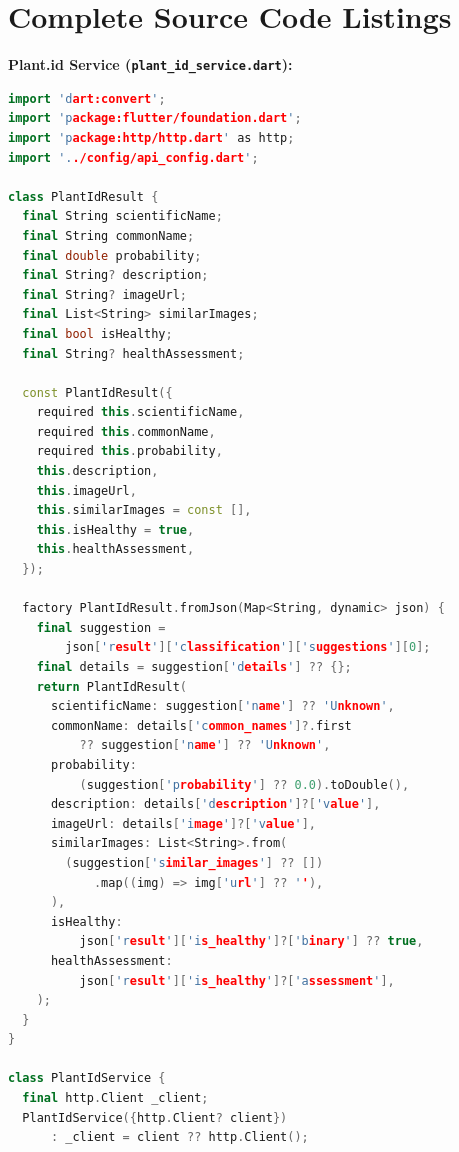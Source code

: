 \newpage
\section{Complete Source Code Listings}
\justify

\textbf{Plant.id Service (\texttt{plant\_id\_service.dart}):}
\begin{lstlisting}[language=C++]
import 'dart:convert';
import 'package:flutter/foundation.dart';
import 'package:http/http.dart' as http;
import '../config/api_config.dart';

class PlantIdResult {
  final String scientificName;
  final String commonName;
  final double probability;
  final String? description;
  final String? imageUrl;
  final List<String> similarImages;
  final bool isHealthy;
  final String? healthAssessment;

  const PlantIdResult({
    required this.scientificName,
    required this.commonName,
    required this.probability,
    this.description,
    this.imageUrl,
    this.similarImages = const [],
    this.isHealthy = true,
    this.healthAssessment,
  });

  factory PlantIdResult.fromJson(Map<String, dynamic> json) {
    final suggestion =
        json['result']['classification']['suggestions'][0];
    final details = suggestion['details'] ?? {};
    return PlantIdResult(
      scientificName: suggestion['name'] ?? 'Unknown',
      commonName: details['common_names']?.first
          ?? suggestion['name'] ?? 'Unknown',
      probability:
          (suggestion['probability'] ?? 0.0).toDouble(),
      description: details['description']?['value'],
      imageUrl: details['image']?['value'],
      similarImages: List<String>.from(
        (suggestion['similar_images'] ?? [])
            .map((img) => img['url'] ?? ''),
      ),
      isHealthy:
          json['result']['is_healthy']?['binary'] ?? true,
      healthAssessment:
          json['result']['is_healthy']?['assessment'],
    );
  }
}

class PlantIdService {
  final http.Client _client;
  PlantIdService({http.Client? client})
      : _client = client ?? http.Client();


\end{lstlisting}
